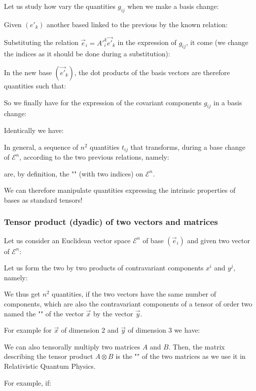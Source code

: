 	Let us study how vary the quantities $g_{ij}$ when we make a basis change:

	Given $({e'}_k)$ another based linked to the previous by the known relation:
	
	Substituting the relation $\vec{e}_i={A'}_i^k\vec{e'}_k$ in the expression of $g_{ij}$, it come (we change the indices as it should be done during a substitution):
	
	In the new base $(\vec{e'}_k)$, the dot products of the basis vectors are therefore quantities such that:
	
	So we finally have for the expression of the covariant components $g_{ij}$ in a basis change:
	
	Identically we have:
	
	In general, a sequence of $n^2$ quantities $t_{ij}$ that transforms, during a base change of $\mathcal{E}^n$, according to the two previous relations, namely:
	
	are, by definition, the "" (with two indices) on $\mathcal{E}^n$.

	We can therefore manipulate quantities expressing the intrinsic properties of bases as standard tensors!
	
	\subsubsection{Tensor product (dyadic) of two vectors and matrices}\label{tensor product}
	Let us consider an Euclidean vector space $\mathcal{E}^n$ of base $(\vec{e}_i)$ and given two vector of $\mathcal{E}^n$:
	
	Let us form the two by two products of contravariant components $x^i$ and $y^j$, namely:
	
	We thus get $n^2$ quantities, if the two vectors have the same number of components, which are also the contravariant components of a tensor of order two named the "" of the vector $\vec{x}$ by the vector $\vec{y}$.
	
	For example for $\vec{x}$ of dimension $2$ and $\vec{y}$ of dimension $3$ we have:
	
	We can also tensorally multiply two matrices $A$ and $B$. Then, the matrix describing the tensor product $A\otimes B$ is the "\label{kronecker product}" of the two matrices as we use it in Relativistic Quantum Physics.
	
	For example, if:
	

